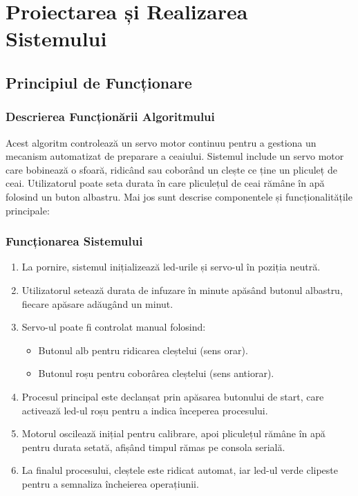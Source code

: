 \chapter{Proiectarea și Realizarea Sistemului}
\label{chap:2}

\section{Principiul de Funcționare}

\subsection{Descrierea Funcționării Algoritmului}

Acest algoritm controlează un servo motor %
continuu pentru a gestiona un mecanism %
automatizat de preparare a ceaiului. %
Sistemul include un servo motor care %
bobinează o sfoară, ridicând sau %
coborând un clește ce ține un %
pliculeț de ceai. Utilizatorul poate %
seta durata în care pliculețul de ceai %
rămâne în apă folosind un %
buton albastru. Mai jos sunt descrise %
componentele și funcționalitățile %
principale:

\subsection{Funcționarea Sistemului}

\begin{enumerate}
    \item La pornire, sistemul inițializează %
    \gls{led}-urile și servo-ul în poziția %
    neutră.  

    \item Utilizatorul setează durata de %
    infuzare în minute apăsând %
    butonul albastru, fiecare apăsare %
    adăugând un minut.  

    \item Servo-ul poate fi controlat %
    manual folosind:  
    \begin{itemize}
        \item Butonul alb pentru ridicarea %
        cleștelui (sens orar).  
        \item Butonul roșu pentru coborârea %
        cleștelui (sens antiorar).  
    \end{itemize}

    \item Procesul principal este declanșat %
    prin apăsarea butonului de start, %
    care activează \gls{led}-ul roșu pentru %
    a indica începerea procesului.  

    \item Motorul oscilează inițial pentru %
    calibrare, apoi pliculețul %
    rămâne în apă pentru durata %
    setată, afișând timpul rămas %
    pe consola serială.  

    \item La finalul procesului, cleștele %
    este ridicat automat, iar \gls{led}-ul %
    verde clipeste pentru a semnaliza %
    încheierea operațiunii.  
\end{enumerate}

